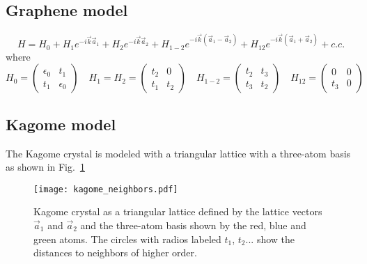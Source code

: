 \documentclass[a4paper]{article}
\begin{document}
\subsection{Graphene model}
\begin{equation}
  H = H_0 + H_1e^{-i\vec{k}\vec{a}_1} + H_2e^{-i\vec{k}\vec{a}_2}+
      H_{1-2}e^{-i\vec{k}(\vec{a}_1-\vec{a}_2)}+
      H_{12}e^{-i\vec{k}(\vec{a}_1+\vec{a}_2)} + c.c.
\end{equation}
where
\begin{equation}
  H_0 = \left(\begin{array}{cc}
    \epsilon_0 & t_1 \\
    t_1 & \epsilon_0
  \end{array}\right)\quad
  H_1 = H_2 = \left(\begin{array}{cc}
    t_2 & 0 \\
    t_1 & t_2
  \end{array}\right)\quad
  H_{1-2} = \left(\begin{array}{cc}
    t_2 & t_3 \\
    t_3 & t_2
  \end{array}\right)\quad
  H_{12} = \left(\begin{array}{cc}
    0 & 0 \\
    t_3 & 0
  \end{array}\right)
\end{equation}

\subsection{Kagome model}
The Kagome crystal is modeled with a triangular lattice with a three-atom basis as shown in Fig.~\ref{kagome_lat}

\begin{figure}[h!]
\centering
  \texttt{[image: kagome\_neighbors.pdf]}
\vspace{-5pt}
\caption{Kagome crystal as a triangular lattice defined by the lattice vectors $\vec{a}_1$ and $\vec{a}_2$ and the three-atom basis shown by the red, blue and green atoms. The circles with radios labeled $t_1$, $t_2$... show the distances to neighbors of higher order.}
\label{kagome_lat}
\end{figure}
\FloatBarrier
\end{document}
